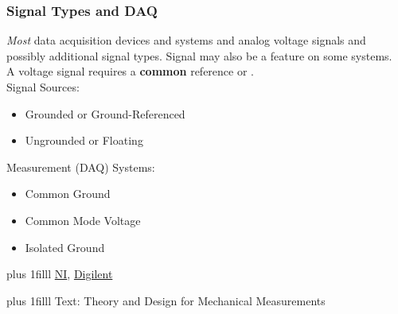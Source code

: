 \documentclass[fleqn]{beamer} %
\newcommand{\sectionIIsubsectionItitle}{Signal Types and DAQ}
\newcommand{\btVFill}{\vskip0pt plus 1filll}
\begin{document}
			\begin{frame}[label=sectionIIsubsectionI]
				\frametitle{\sectionIIsubsectionItitle} \scriptsize

				\bigskip	

				{\it Most} data acquisition devices and systems \underline{\hspace{20mm}} and \underline{\hspace{20mm}} {\BL analog} voltage signals and possibly additional signal types. Signal \underline{\hspace{20mm}} may also be a feature on some systems. \vspace{5mm}\\

				A voltage signal requires a {\bf common} reference or \underline{\hspace{20mm}}.	\vspace{2mm}\\

				Signal Sources:
				\begin{itemize}
					\item Grounded or Ground-Referenced	\vspace{2mm}\\

					\item Ungrounded or Floating \vspace{2mm}\\		

				\end{itemize}	
				\vspace*{5mm}

				Measurement (DAQ) Systems:
				\begin{itemize}
					\item Common Ground \vspace{2mm}\\

					\item Common Mode Voltage \vspace{2mm}\\

					\item Isolated Ground \vspace{2mm}\\

				\end{itemize}
				

				\btVFill
				\tiny{\href{https://www.ni.com/en/support/documentation/supplemental/06/grounding-considerations---intermediate-analog-concepts.html}{NI},}
				\tiny{\href{https://digilent.com/reference/daq-and-datalogging/documents/analog-input-signal-connections-1}{Digilent}}

				\btVFill
				\tiny{Text: Theory and Design for Mechanical Measurements}
		
			\end{frame}
\end{document}
